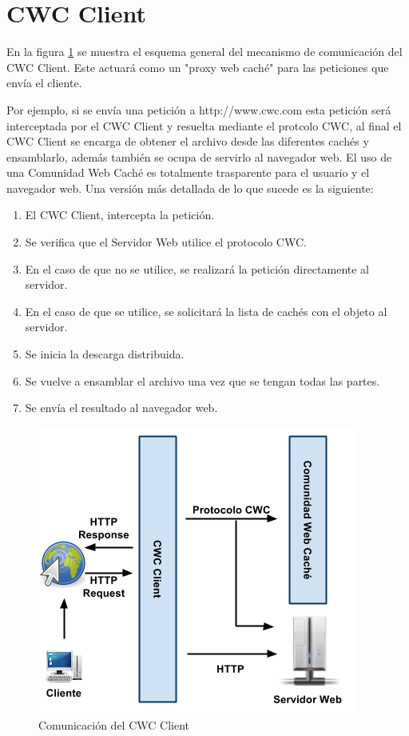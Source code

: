 \section{CWC Client}
En la figura \ref{ComunicacionCWCClient} se muestra el esquema general del mecanismo de comunicación del CWC Client. Este actuará como un "proxy web caché" para las peticiones que envía el cliente. 

Por ejemplo, si se envía una petición a http://www.cwc.com esta petición será interceptada por el CWC Client y resuelta mediante el protcolo CWC, al final el CWC Client se encarga de obtener el archivo desde las diferentes cachés y ensamblarlo, además también se ocupa de servirlo al navegador web. El uso de una Comunidad Web Caché es totalmente trasparente para el usuario y el navegador web. Una versión más detallada de lo que sucede es la siguiente:

\begin{enumerate}
\item El CWC Client, intercepta la petición.
\item Se verifica que el Servidor Web utilice el protocolo CWC.
\item En el caso de que no se utilice, se realizará la petición directamente al servidor.
\item En el caso de que se utilice, se solicitará la lista de cachés con el objeto al servidor.
\item Se inicia la descarga distribuida.
\item Se vuelve a ensamblar el archivo una vez que se tengan todas las partes.
\item Se envía el resultado al navegador web.
\end{enumerate}

\begin{figure}
  \centering
    \includegraphics[scale=0.75]{gfx/ComunicacionCWCClient}
  \caption{Comunicación del CWC Client}
  \label{ComunicacionCWCClient}
\end{figure}

